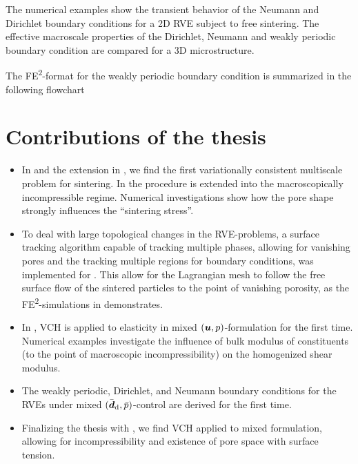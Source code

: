 \documentclass[MikaelDissertation.tex]{subfiles}
\begin{document}
\begin{itemize}
The numerical examples show the transient behavior of the Neumann and Dirichlet boundary conditions for a 2D RVE subject to free sintering.
The effective macroscale properties of the Dirichlet, Neumann and weakly periodic boundary condition are compared for a 3D microstructure.

The FE\textsuperscript{2}-format for the weakly periodic boundary condition is summarized in the following flowchart
\begin{center}
  
\end{center}

\end{itemize}


\chapter{Contributions of the thesis}
\begin{itemize}
 \item In  and the extension in , we find the first variationally consistent multiscale problem for sintering.
   In  the procedure is extended into the macroscopically incompressible regime. Numerical investigations show how the pore shape strongly influences the ``sintering stress''.
 \item To deal with large topological changes in the RVE-problems, a surface tracking algorithm capable of tracking multiple phases, allowing for vanishing pores and the tracking multiple regions for boundary conditions, was implemented for . 
   This allow for the Lagrangian mesh to follow the free surface flow of the sintered particles to the point of vanishing porosity, as the FE\textsuperscript{2}-simulations in  demonstrates.
 \item In , VCH is applied to elasticity in mixed $(\boldsymbol{u},p)$-formulation for the first time.
  Numerical examples investigate the influence of bulk modulus of constituents (to the point of macroscopic incompressibility) on the homogenized shear modulus.
 \item The weakly periodic, Dirichlet, and Neumann boundary conditions for the RVEs under mixed $(\bar{\boldsymbol{d}}_{\mathrm{d}},\bar{p})$-control are derived for the first time.
 \item Finalizing the thesis with , we find VCH applied to mixed formulation, allowing for incompressibility and existence of pore space with surface tension.
\end{itemize}
\end{document}
